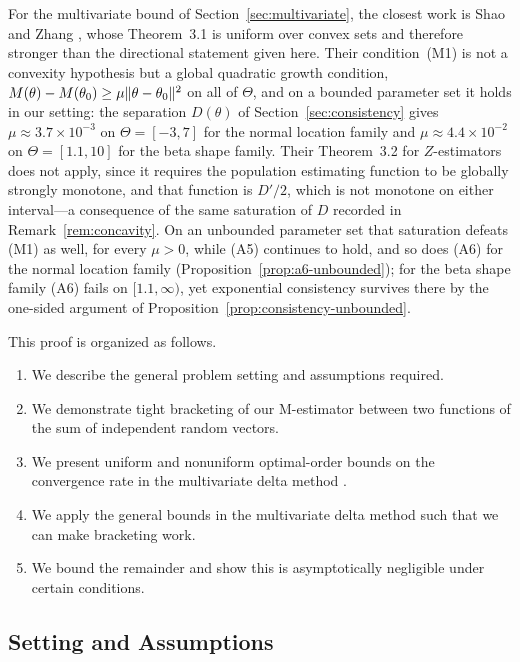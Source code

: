 For the multivariate bound of Section~\ref{sec:multivariate}, the closest work is Shao and Zhang \cite{ShaoZhang2021}, whose Theorem~3.1 is uniform over convex sets and therefore stronger than the directional statement given here. Their condition~(M1) is not a convexity hypothesis but a global quadratic growth condition, $M(\theta)-M(\theta_{0})\ge\mu\lVert\theta-\theta_{0}\rVert^{2}$ on all of $\Theta$, and on a bounded parameter set it holds in our setting: the separation $D(\theta)$ of Section~\ref{sec:consistency} gives $\mu\approx3.7\times10^{-3}$ on $\Theta=[-3,7]$ for the normal location family and $\mu\approx4.4\times10^{-2}$ on $\Theta=[1.1,10]$ for the beta shape family. Their Theorem~3.2 for $Z$-estimators does not apply, since it requires the population estimating function to be globally strongly monotone, and that function is $D'/2$, which is not monotone on either interval---a consequence of the same saturation of $D$ recorded in Remark~\ref{rem:concavity}. On an unbounded parameter set that saturation defeats (M1) as well, for every $\mu>0$, while (A5) continues to hold, and so does (A6) for the normal location family (Proposition~\ref{prop:a6-unbounded}); for the beta shape family (A6) fails on $[1.1,\infty)$, yet exponential consistency survives there by the one-sided argument of Proposition~\ref{prop:consistency-unbounded}.

This proof is organized as follows.

\begin{enumerate}
	\item We describe the general problem setting and assumptions required.
	\item We demonstrate tight bracketing of our M-estimator between two functions of the sum of independent random vectors.
	\item We present uniform and nonuniform optimal-order bounds on the convergence rate in the multivariate delta method \cite{Pinelis2016}.
	\item We apply the general bounds in the multivariate delta method such that we can make bracketing work.
	\item We bound the remainder and show this is asymptotically negligible under certain conditions.
\end{enumerate}

\subsection{Setting and Assumptions}\label{sec:setting}

